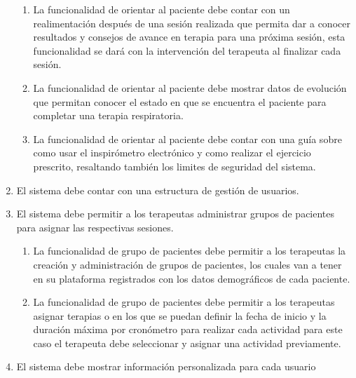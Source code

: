 \documentclass[12pt]{article}
\begin{document}
\begin{enumerate}[start=1,label={\bfseries RF0\arabic*.}]
\begin{enumerate}[label*=\arabic*.]
                \item La funcionalidad de orientar al paciente debe contar con un realimentación después de una sesión realizada que permita dar a conocer resultados y consejos de avance en terapia para una próxima sesión, esta funcionalidad se dará con la intervención del terapeuta al finalizar cada sesión.
    
                \item La funcionalidad de orientar al paciente debe mostrar datos de evolución que permitan conocer el estado en que se encuentra el paciente para completar una terapia respiratoria.
                
                \item La funcionalidad de orientar al paciente debe contar con una guía sobre como usar el inspirómetro electrónico y como realizar el ejercicio prescrito, resaltando también los limites de seguridad del sistema.
            \end{enumerate}
            
            


 
    \item El sistema debe contar con una estructura de gestión de usuarios.
    \item El sistema debe permitir a los terapeutas  administrar grupos de pacientes para asignar las respectivas sesiones.
    \label{RF10}
        \begin{enumerate}[label*=\arabic*.]
            \item La funcionalidad de grupo de pacientes debe permitir a los terapeutas la creación y administración de grupos de pacientes, los cuales van a tener en su plataforma registrados con los datos demográficos de cada paciente.
            
            \item La funcionalidad de grupo de pacientes debe permitir a los terapeutas asignar terapias o en los que se puedan definir la fecha de inicio y la duración máxima por cronómetro para realizar cada actividad para este caso el terapeuta debe seleccionar y asignar una actividad previamente.
        \end{enumerate}
        
    \item El sistema debe mostrar información personalizada para cada usuario
            

\end{enumerate}
\end{document}
